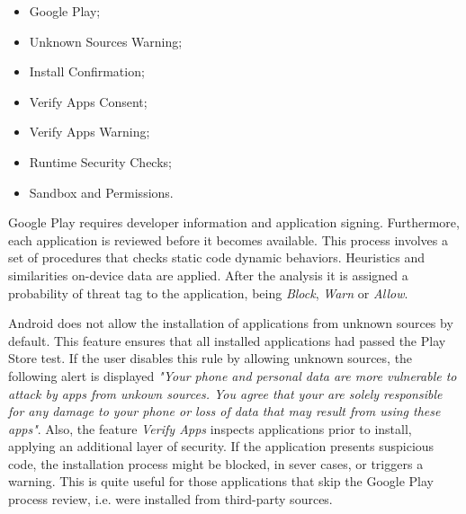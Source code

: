 \begin{itemize}
\item Google Play;
\item Unknown Sources Warning;
\item Install Confirmation;
\item Verify Apps Consent;
\item Verify Apps Warning;
\item Runtime Security Checks;
\item Sandbox and Permissions.
\end{itemize}

Google Play requires developer information and application signing. Furthermore, each application is reviewed before it becomes available. This process involves a set of procedures that checks static code dynamic behaviors. Heuristics and similarities on-device data are applied. After the analysis it is assigned a probability of threat tag to the application, being \textit{Block}, \textit{Warn} or \textit{Allow}.

Android does not allow the installation of applications from unknown sources by default. This feature ensures that all installed applications had passed the Play Store test. If the user disables this rule by allowing unknown sources, the following alert is displayed \textit{"Your phone and personal data are more vulnerable to attack by apps from unkown sources. You agree that your are solely responsible for any damage to your phone or loss of data that may result from using these apps"}. Also, the feature \textit{Verify Apps} inspects applications prior to install, applying an additional layer of security. If the application presents suspicious code, the installation process might be blocked, in sever cases, or triggers a warning. This is quite useful for those applications that skip the Google Play process review, i.e. were installed from third-party sources.
